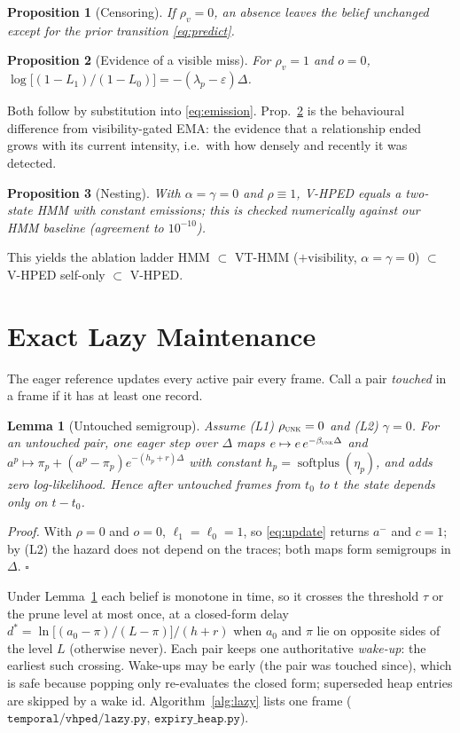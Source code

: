 \documentclass[conference]{IEEEtran}
\newtheorem{proposition}{Proposition}
\newtheorem{lemma}{Lemma}
\newcommand{\softplus}{\operatorname{softplus}}
\newcommand{\UNK}{\textsc{unk}}
\begin{document}
\begin{proposition}[Censoring]\label{prop:censor}
If $\rho_v=0$, an absence leaves the belief unchanged except for the prior transition
\eqref{eq:predict}.
\end{proposition}
\begin{proposition}[Evidence of a visible miss]\label{prop:evidence}
For $\rho_v=1$ and $o=0$,
$\log\big[(1-L_1)/(1-L_0)\big]=-(\lambda_p-\varepsilon)\Delta$.
\end{proposition}
Both follow by substitution into \eqref{eq:emission}. Prop.~\ref{prop:evidence} is the
behavioural difference from visibility-gated EMA: the evidence that a relationship
ended grows with its current intensity, i.e.\ with how densely and recently it was
detected.
\begin{proposition}[Nesting]\label{prop:nest}
With $\alpha=\gamma=0$ and $\rho\equiv1$, V-HPED equals a two-state HMM with constant
emissions; this is checked numerically against our HMM baseline (agreement to $10^{-10}$).
\end{proposition}
This yields the ablation ladder HMM $\subset$ VT-HMM ($+$visibility, $\alpha=\gamma=0$)
$\subset$ V-HPED self-only $\subset$ V-HPED.

\section{Exact Lazy Maintenance}
The eager reference updates every active pair every frame. Call a pair
\emph{touched} in a frame if it has at least one record.

\begin{lemma}[Untouched semigroup]\label{lem:semigroup}
Assume (L1) $\rho_{\UNK}=0$ and (L2) $\gamma=0$. For an untouched pair, one eager step
over $\Delta$ maps $e\mapsto e\,e^{-\beta_{\UNK}\Delta}$ and
$a^p\mapsto\pi_p+(a^p-\pi_p)e^{-(h_p+r)\Delta}$ with constant
$h_p=\softplus(\eta_p)$, and adds zero log-likelihood. Hence after untouched frames
from $t_0$ to $t$ the state depends only on $t-t_0$.
\end{lemma}
\emph{Proof.} With $\rho=0$ and $o=0$, $\ell_1=\ell_0=1$, so \eqref{eq:update} returns
$a^-$ and $c=1$; by (L2) the hazard does not depend on the traces; both maps form
semigroups in $\Delta$. \hfill$\square$

Under Lemma~\ref{lem:semigroup} each belief is monotone in time, so it crosses the
threshold $\tau$ or the prune level at most once, at a closed-form delay
$d^\ast=\ln\!\big[(a_0-\pi)/(L-\pi)\big]/(h+r)$ when $a_0$ and $\pi$ lie on opposite
sides of the level $L$ (otherwise never). Each pair keeps one authoritative
\emph{wake-up}: the earliest such crossing. Wake-ups may be early (the pair was touched
since), which is safe because popping only re-evaluates the closed form; superseded
heap entries are skipped by a wake id. Algorithm~\ref{alg:lazy} lists one frame
($\texttt{temporal/vhped/lazy.py}$, $\texttt{expiry\_heap.py}$).
\end{document}
